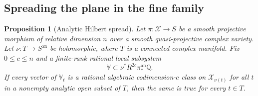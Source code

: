 \documentclass[11pt]{article}
\newcommand{\Q}{\mathbb Q}
\newtheorem{proposition}[theorem]{Proposition}
\numberwithin{equation}{section}
\begin{document}
\subsection{Spreading the plane in the fine family}
\label{p3sw:endpoint-spread-section}

\begin{proposition}[Analytic Hilbert spread]
\label{p3sw:spread}
Let \(\pi:\mathcal X\to S\) be a smooth projective morphism of
relative dimension \(n\) over a smooth quasi-projective complex
variety.  Let \(\nu:T\to S^{\mathrm{an}}\) be holomorphic, where
\(T\) is a connected complex manifold.  Fix \(0\leq c\leq n\)
and a finite-rank rational local subsystem
\[
 \mathbb V\subset\nu^*R^{2c}\pi^{\mathrm{an}}_*\Q.
\]
If every vector of \(\mathbb V_t\) is a rational algebraic
codimension-\(c\) class on \(\mathcal X_{\nu(t)}\) for all \(t\)
in a nonempty analytic open subset of \(T\), then the same is
true for every \(t\in T\).
\end{proposition}
\end{document}
